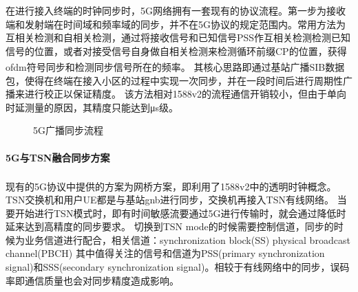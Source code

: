 \documentclass[UTF8,a4paper,12pt]{ctexart}
\numberwithin{equation}{section}
\begin{document}
在进行接入终端的时钟同步时，5G网络拥有一套现有的协议流程。第一步为接收端和发射端在时间域和频率域的同步，并不在5G协议的规定范围内。常用方法为互相关检测和自相关检测，通过将接收信号和已知信号PSS作互相关检测检测已知信号的位置，或者对接受信号自身做自相关检测来检测循环前缀CP的位置，获得ofdm符号同步和检测同步信号所在的频率\textsuperscript{\cite{goodarzi2020synchronization}}。
其核心思路即通过基站广播SIB数据包，使得在终端在接入小区的过程中实现一次同步，并在一段时间后进行周期性广播来进行校正以保证精度。
该方法相对1588v2的流程通信开销较小，但由于单向时延测量的原因，其精度只能达到μs级。
\begin{figure}[htb] 
	\caption{5G广播同步流程}
\end{figure}
\paragraph{5G与TSN融合同步方案}
现有的5G协议中提供的方案为网桥方案\textsuperscript{\cite{nikhileswar2022traffic}}，即利用了1588v2中的透明时钟概念。TSN交换机和用户UE都是与基站gnb进行同步，交换机再接入TSN有线网络。
当要开始进行TSN模式时，即有时间敏感流要通过5G进行传输时，就会通过降低时延来达到高精度的同步要求。
切换到TSN mode的时候需要控制信道，同步的时候为业务信道进行配合，相关信道：synchronization block(SS)   physical broadcast channel(PBCH)
其中值得关注的信号和信道为PSS(primary synchronization signal)和SSS(secondary synchronization signal)。相较于有线网络中的同步，误码率即通信质量也会对同步精度造成影响。
\end{document}
